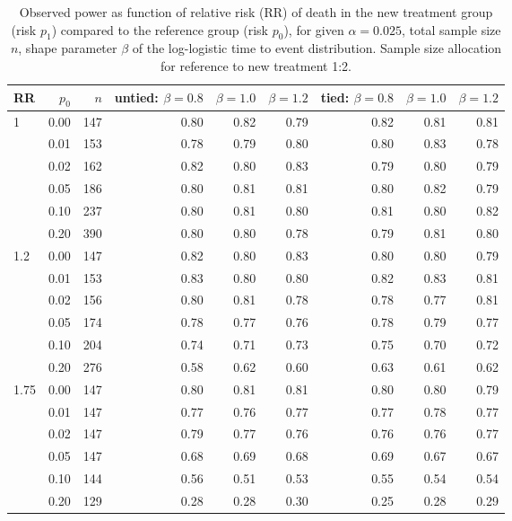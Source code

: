 \documentclass[bimj,fleqn]{w-art}\usepackage[]{graphicx}\usepackage[]{color}
\theoremstyle{plain}
\theoremstyle{definition}
\begin{document}
\begin{table}[ht]
\centering
\caption{Observed power as function of relative risk
             (RR) of death in the new treatment group (risk $p_1$) compared to
             the reference group (risk $p_0$), for given $\alpha =0.025$,
             total sample size $n$, shape parameter $\beta$ of the log-logistic time
             to event distribution. Sample size allocation for reference to new
             treatment 1:2. } 
\label{tab:simresult}
\begin{tabular}{lrrrrrrrr}
  \hline
RR & $p_0$ & $n$ & untied: $\beta = 0.8$ & $\beta = 1.0$ & $\beta = 1.2$ & tied: $\beta = 0.8$ & $\beta = 1.0$ & $\beta = 1.2$ \\ 
  \hline
1 & 0.00 & 147 & 0.80 & 0.82 & 0.79 & 0.82 & 0.81 & 0.81 \\ 
    & 0.01 & 153 & 0.78 & 0.79 & 0.80 & 0.80 & 0.83 & 0.78 \\ 
    & 0.02 & 162 & 0.82 & 0.80 & 0.83 & 0.79 & 0.80 & 0.79 \\ 
    & 0.05 & 186 & 0.80 & 0.81 & 0.81 & 0.80 & 0.82 & 0.79 \\ 
    & 0.10 & 237 & 0.80 & 0.81 & 0.80 & 0.81 & 0.80 & 0.82 \\ 
    & 0.20 & 390 & 0.80 & 0.80 & 0.78 & 0.79 & 0.81 & 0.80 \\ 
  1.2 & 0.00 & 147 & 0.82 & 0.80 & 0.83 & 0.80 & 0.80 & 0.79 \\ 
    & 0.01 & 153 & 0.83 & 0.80 & 0.80 & 0.82 & 0.83 & 0.81 \\ 
    & 0.02 & 156 & 0.80 & 0.81 & 0.78 & 0.78 & 0.77 & 0.81 \\ 
    & 0.05 & 174 & 0.78 & 0.77 & 0.76 & 0.78 & 0.79 & 0.77 \\ 
    & 0.10 & 204 & 0.74 & 0.71 & 0.73 & 0.75 & 0.70 & 0.72 \\ 
    & 0.20 & 276 & 0.58 & 0.62 & 0.60 & 0.63 & 0.61 & 0.62 \\ 
  1.75 & 0.00 & 147 & 0.80 & 0.81 & 0.81 & 0.80 & 0.80 & 0.79 \\ 
    & 0.01 & 147 & 0.77 & 0.76 & 0.77 & 0.77 & 0.78 & 0.77 \\ 
    & 0.02 & 147 & 0.79 & 0.77 & 0.76 & 0.76 & 0.76 & 0.77 \\ 
    & 0.05 & 147 & 0.68 & 0.69 & 0.68 & 0.69 & 0.67 & 0.67 \\ 
    & 0.10 & 144 & 0.56 & 0.51 & 0.53 & 0.55 & 0.54 & 0.54 \\ 
    & 0.20 & 129 & 0.28 & 0.28 & 0.30 & 0.25 & 0.28 & 0.29 \\ 

\end{tabular}
\end{table}
\end{document}
